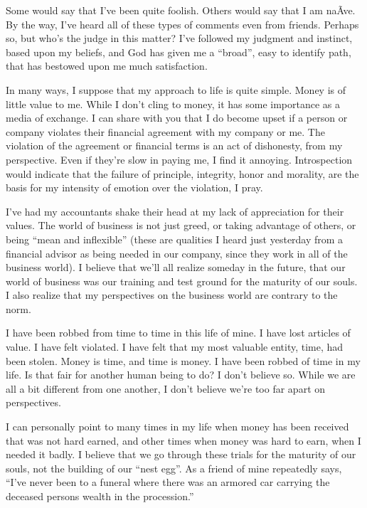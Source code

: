 \documentclass[12pt]{memoir}
\begin{document}
Some would say that I've been quite foolish. Others would say that
I am na\~{A}\textasciimacron ve. By the way, I've heard all of these
types of comments even from friends. Perhaps so, but who's the judge
in this matter? I've followed my judgment and instinct, based upon
my beliefs, and God has given me a ``broad'', easy to identify path,
that has bestowed upon me much satisfaction. 

In many ways, I suppose that my approach to life is quite simple.
Money is of little value to me. While I don't cling to money, it has
some importance as a media of exchange. I can share with you that
I do become upset if a person or company violates their financial
agreement with my company or me. The violation of the agreement or
financial terms is an act of dishonesty, from my perspective. Even
if they're slow in paying me, I find it annoying. Introspection would
indicate that the failure of principle, integrity, honor and morality,
are the basis for my intensity of emotion over the violation, I pray. 

I've had my accountants shake their head at my lack of appreciation
for their values. The world of business is not just greed, or taking
advantage of others, or being ``mean and inflexible'' (these are
qualities I heard just yesterday from a financial advisor as being
needed in our company, since they work in all of the business world).
I believe that we'll all realize someday in the future, that our world
of business was our training and test ground for the maturity of our
souls. I also realize that my perspectives on the business world are
contrary to the norm.

I have been robbed from time to time in this life of mine. I have
lost articles of value. I have felt violated. I have felt that my
most valuable entity, time, had been stolen. Money is time, and time
is money. I have been robbed of time in my life. Is that fair for
another human being to do? I don't believe so. While we are all a
bit different from one another, I don't believe we're too far apart
on perspectives. 

I can personally point to many times in my life when money has been
received that was not hard earned, and other times when money was
hard to earn, when I needed it badly. I believe that we go through
these trials for the maturity of our souls, not the building of our
``nest egg''. As a friend of mine repeatedly says, ``I've never
been to a funeral where there was an armored car carrying the deceased
persons wealth in the procession.'' 
\end{document}
